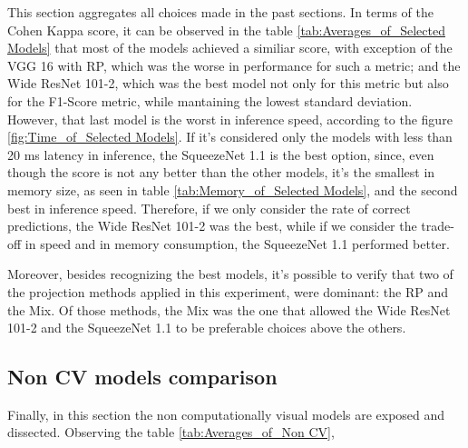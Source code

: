 This section aggregates all choices made in the past sections. In terms of the Cohen Kappa score, it can be observed in the table \ref{tab:Averages_of_Selected Models} that most of the models achieved a similiar score, with exception of the VGG 16 with \acrshort{RP}, which was the worse in performance for such a metric; and the Wide ResNet 101-2, which was the best model not only for this metric but also for the F1-Score metric, while mantaining the lowest standard deviation. However, that last model is the worst in inference speed, according to the figure \ref{fig:Time_of_Selected Models}. If it's considered only the models with less than 20 ms latency in inference, the SqueezeNet 1.1 is the best option, since, even though the score is not any better than the other models, it's the smallest in memory size, as seen in table \ref{tab:Memory_of_Selected Models}, and the second best in inference speed. Therefore, if we only consider the rate of correct predictions, the Wide ResNet 101-2 was the best, while if we consider the trade-off in speed and in memory consumption, the SqueezeNet 1.1 performed better.

Moreover, besides recognizing the best models, it's possible to verify that two of the projection methods applied in this experiment, were dominant: the \acrshort{RP} and the \acrshort{Mix}. Of those methods, the \acrshort{Mix} was the one that allowed the Wide ResNet 101-2 and the SqueezeNet 1.1 to be preferable choices above the others.	

\subsection{Non CV models comparison}






Finally, in this section the non computationally visual models are exposed and dissected. Observing the table \ref{tab:Averages_of_Non CV},  
